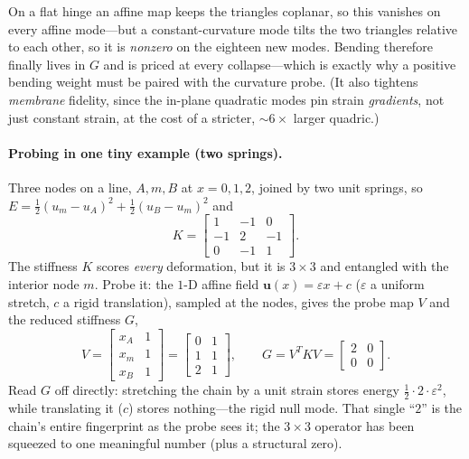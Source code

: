 \begin{itemize}
        On a flat hinge an affine map keeps the triangles coplanar, so this vanishes on every affine mode---but a constant-curvature mode tilts the two triangles relative to each other, so it is \emph{nonzero} on the eighteen new modes.
        Bending therefore finally lives in $G$ and is priced at every collapse---which is exactly why a positive bending weight must be paired with the curvature probe.
        (It also tightens \emph{membrane} fidelity, since the in-plane quadratic modes pin strain \emph{gradients}, not just constant strain, at the cost of a stricter, ${\sim}6\times$ larger quadric.)
\end{itemize}


\paragraph{Probing in one tiny example (two springs).}
Three nodes on a line, $A,m,B$ at $x=0,1,2$, joined by two unit springs, so $E=\tfrac12(u_m-u_A)^2+\tfrac12(u_B-u_m)^2$ and
\begin{equation}
  K=\begin{bmatrix}1&-1&0\\-1&2&-1\\0&-1&1\end{bmatrix}.
\end{equation}
The stiffness $K$ scores \emph{every} deformation, but it is $3\times3$ and entangled with the interior node $m$.
Probe it: the $1$-D affine field $\mathbf{u}(x)=\varepsilon x+c$ ($\varepsilon$ a uniform stretch, $c$ a rigid translation), sampled at the nodes, gives the probe map $V$ and the reduced stiffness $G$,
\begin{equation}
  V=\begin{bmatrix}x_A&1\\x_m&1\\x_B&1\end{bmatrix}
   =\begin{bmatrix}0&1\\1&1\\2&1\end{bmatrix},
  \qquad
  G=V^TKV=\begin{bmatrix}2&0\\0&0\end{bmatrix}.
\end{equation}
Read $G$ off directly: stretching the chain by a unit strain stores energy $\tfrac12\cdot 2\cdot\varepsilon^2$, while translating it ($c$) stores nothing---the rigid null mode.
That single ``$2$'' is the chain's entire fingerprint as the probe sees it; the $3\times3$ operator has been squeezed to one meaningful number (plus a structural zero).

